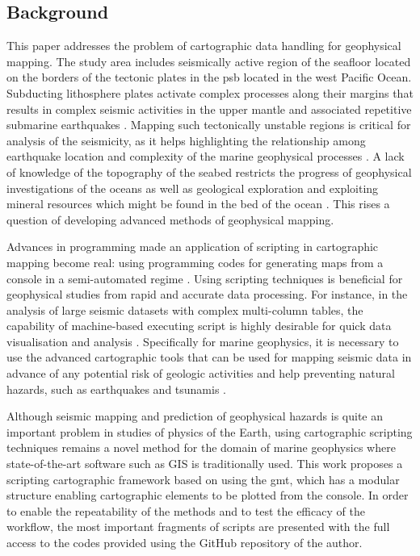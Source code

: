 \documentclass{rrparticle}
\begin{document}
\subsection{Background}
This paper addresses the problem of cartographic data handling for geophysical mapping. The study area includes seismically active region of the seafloor located on the borders of the tectonic plates in the \ac{psb} located in the west Pacific Ocean. Subducting lithosphere plates activate complex processes along their margins that results in complex seismic activities in the upper mantle and associated repetitive submarine earthquakes \cite{KIMURA200918,TANGYOUBIAO1990219,HORI200685,Uchida}. Mapping such tectonically unstable regions is critical for analysis of the seismicity, as it helps highlighting the relationship among earthquake location and complexity of the marine geophysical processes \cite{ZU2021106800,SACKS19843,IIDAKA201741,LI2020102127}. A lack of knowledge of the topography of the seabed restricts the progress of geophysical investigations of the oceans as well as geological exploration and exploiting mineral resources which might be found in the bed of the ocean \cite{HILL1957129}. This rises a question of developing advanced methods of geophysical mapping.

Advances in programming made an application of scripting in cartographic mapping become real: using programming codes for generating maps from a console in a semi-automated regime \cite{Buetal,Lemenkova2022c,6910592}. Using scripting techniques is beneficial for geophysical studies from rapid and accurate data processing. For instance, in the analysis of large seismic datasets with complex multi-column tables, the capability of machine-based executing script is highly desirable for quick data visualisation and analysis \cite{9497221,7951907,7363985}. Specifically for marine geophysics, it is necessary to use the advanced cartographic tools that can be used for mapping seismic data in advance of any potential risk of geologic activities and help preventing natural hazards, such as earthquakes and tsunamis \cite{SUZUKI201690,SAITO2019228166}. 

Although seismic mapping and prediction of geophysical hazards is quite an important problem in studies of physics of the Earth, using cartographic scripting techniques remains a novel method for the domain of marine geophysics where state-of-the-art software such as GIS is traditionally used. This work proposes a scripting cartographic framework based on using the \ac{gmt}, which has a modular structure enabling cartographic elements to be plotted from the console. In order to enable the repeatability of the methods and to test the efficacy of the workflow, the most important fragments of scripts are presented with the full access to the codes provided using the GitHub repository of the author. 
\end{document}
